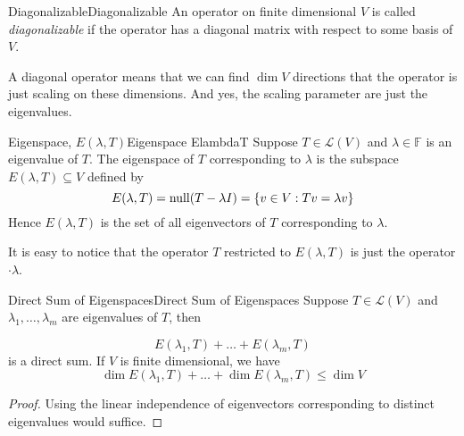 \documentclass[../main.tex]{subfiles}
\begin{document}
\begin{definition}{Diagonalizable}{Diagonalizable}
An operator on finite dimensional $V$ is called \emph{diagonalizable} if the operator has a diagonal matrix with respect to some basis of $V$.
\end{definition}
\begin{remark}
A diagonal operator means that we can find $\dim V$ directions that the operator is just scaling on these dimensions. And yes, the scaling parameter are just the eigenvalues.
\end{remark}

\begin{definition}{Eigenspace, $E(\lambda,T)$}{Eigenspace ElambdaT}
Suppose $T\in \mathscr{L}(V)$ and $\lambda\in \mathbb{F}$ is an eigenvalue of $T$. The eigenspace of $T$ corresponding to $\lambda$ is the subspace $E(\lambda,T) \subseteq V$ defined by
\begin{equation*}
E(\lambda,T) = \operatorname{null} (T-\lambda I) = \left\{ v\in V: Tv = \lambda v \right\}
\end{equation*}
Hence $E(\lambda,T)$ is the set of all eigenvectors of $T$ corresponding to $\lambda$.
\end{definition}

It is easy to notice that the operator $T$ restricted to $E(\lambda,T)$ is just the operator $\cdot \lambda$.

\begin{theorem}{Direct Sum of Eigenspaces}{Direct Sum of Eigenspaces}
Suppose $T\in \mathscr{L}(V)$ and $\lambda_1, \ldots ,\lambda_m$ are eigenvalues of $T$, then

\begin{equation*}
E(\lambda_1,T)+\ldots +E(\lambda_m,T)
\end{equation*}
is a direct sum. If $V$ is finite dimensional, we have
\begin{equation*}
\dim E(\lambda_1,T)+\ldots +\dim E(\lambda_m,T) \leq \dim V
\end{equation*}
\end{theorem}
\begin{proof}
Using the linear independence of eigenvectors corresponding to distinct eigenvalues would suffice.
\end{proof}
\end{document}
